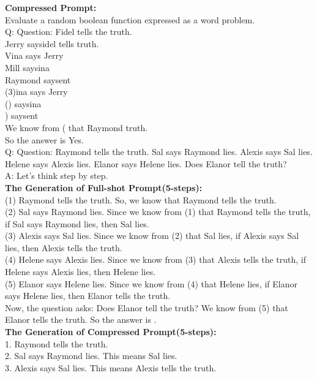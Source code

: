 \begin{figure*}[htb]
    \begin{tcolorbox}
    \textbf{Compressed Prompt:}\\
    Evaluate a random boolean function expressed as a word problem.\\
    Q: Question: Fidel tells the truth.\\
    Jerry saysidel tells truth.\\
    Vina says Jerry\\
    Mill saysina\\
    Raymond saysent\\
    (3)ina says Jerry\\
    () saysina\\
    ) saysent\\
    We know from ( that Raymond truth.\\
    So the answer is Yes.\\
    Q: Question: Raymond tells the truth. Sal says Raymond lies. Alexis says Sal lies. Helene says Alexis lies. Elanor says Helene lies. Does Elanor tell the truth? \\
    A: Let's think step by step.\\
    \textbf{The Generation of Full-shot Prompt(5-steps):}\\
    (1) Raymond tells the truth. So, we know that Raymond tells the truth.\\
    (2) Sal says Raymond lies. Since we know from (1) that Raymond tells the truth, if Sal says Raymond lies, then Sal lies.\\
    (3) Alexis says Sal lies. Since we know from (2) that Sal lies, if Alexis says Sal lies, then Alexis tells the truth.\\
    (4) Helene says Alexis lies. Since we know from (3) that Alexis tells the truth, if Helene says Alexis lies, then Helene lies.\\
    (5) Elanor says Helene lies. Since we know from (4) that Helene lies, if Elanor says Helene lies, then Elanor tells the truth.\\
    Now, the question asks: Does Elanor tell the truth? We know from (5) that Elanor tells the truth. So the answer is .\\
    \textbf{The Generation of Compressed Prompt(5-steps):}\\
    1. Raymond tells the truth.\\
    2. Sal says Raymond lies. This means Sal lies.\\
    3. Alexis says Sal lies. This means Alexis tells the truth.\\

\end{tcolorbox}
\end{figure*}
